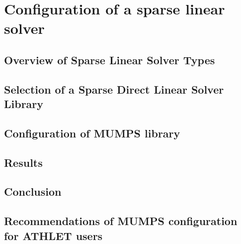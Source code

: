 \chapter{Configuration of a sparse linear solver}

	\section{Overview of Sparse Linear Solver Types}
	

	\section{Selection of a Sparse Direct Linear Solver Library} \label{chapter:solver-selection}
	


	\section{Configuration of MUMPS library} 
	

	\section{Results}
	

	\section{Conclusion}
	

	\section{Recommendations of MUMPS configuration for ATHLET users}
	

